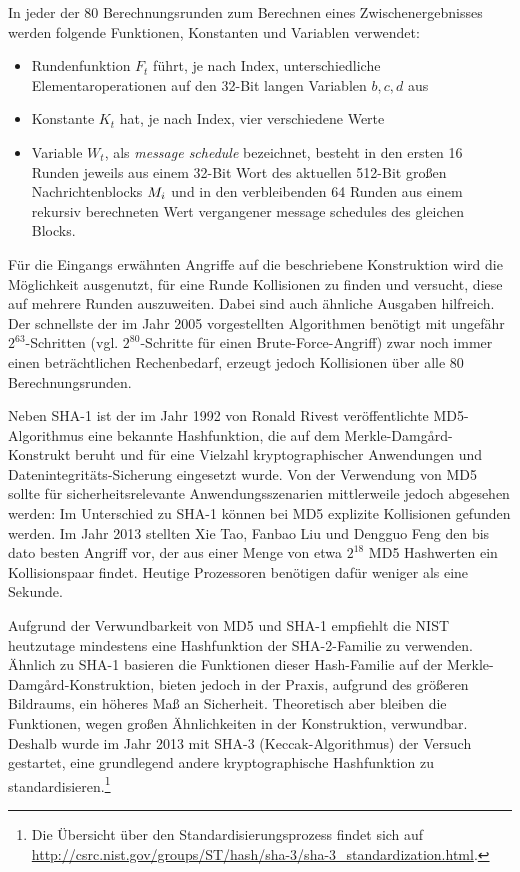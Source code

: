 In jeder der 80 Berechnungsrunden zum Berechnen eines Zwischenergebnisses werden folgende Funktionen, Konstanten und Variablen verwendet:
\begin{itemize}
	\item Rundenfunktion $F_{t}$ führt, je nach Index, unterschiedliche Elementaroperationen auf den 32-Bit langen Variablen $b, c, d$ aus
	\item Konstante $K_{t}$ hat, je nach Index, vier verschiedene Werte
	\item Variable $W_{t}$, als \textit{message schedule} bezeichnet, besteht in den ersten 16 Runden jeweils aus einem 32-Bit Wort des aktuellen 512-Bit großen Nachrichtenblocks $M_{i}$ und in den verbleibenden 64 Runden aus einem rekursiv berechneten Wert vergangener message schedules des gleichen Blocks.
\end{itemize}

Für die Eingangs erwähnten Angriffe auf die beschriebene Konstruktion wird die Möglichkeit ausgenutzt, für eine Runde Kollisionen zu finden und versucht, diese auf mehrere Runden auszuweiten. Dabei sind auch ähnliche Ausgaben hilfreich. Der schnellste der im Jahr 2005 vorgestellten Algorithmen benötigt mit ungefähr $2^{63}$-Schritten (vgl. $2^{80}$-Schritte für einen Brute-Force-Angriff) zwar noch immer einen beträchtlichen Rechenbedarf, erzeugt jedoch Kollisionen über alle 80 Berechnungsrunden.

Neben SHA-1 ist der im Jahr 1992 von Ronald Rivest veröffentlichte MD5-Algorithmus eine bekannte Hashfunktion, die auf dem Merkle-Damgård-Konstrukt beruht und für eine Vielzahl kryptographischer Anwendungen und Datenintegritäts-Sicherung eingesetzt wurde. Von der Verwendung von MD5 sollte für sicherheitsrelevante Anwendungsszenarien mittlerweile jedoch abgesehen werden: Im Unterschied zu SHA-1 können bei MD5 explizite Kollisionen gefunden werden. Im Jahr 2013 stellten Xie Tao, Fanbao Liu und Dengguo Feng den bis dato besten Angriff vor, der aus einer Menge von etwa $2^{18}$ MD5 Hashwerten ein Kollisionspaar findet. Heutige Prozessoren benötigen dafür weniger als eine Sekunde.

Aufgrund der Verwundbarkeit von MD5 und SHA-1 empfiehlt die NIST heutzutage mindestens eine Hashfunktion der SHA-2-Familie zu verwenden. Ähnlich zu SHA-1 basieren die Funktionen dieser Hash-Familie auf der Merkle-Damgård-Konstruktion, bieten jedoch in der Praxis, aufgrund des größeren Bildraums, ein höheres Maß an Sicherheit. Theoretisch aber bleiben die Funktionen, wegen großen Ähnlichkeiten in der Konstruktion, verwundbar. Deshalb wurde im Jahr 2013 mit SHA-3 (\glqq Keccak\grqq{}-Algorithmus) der Versuch gestartet, eine grundlegend andere kryptographische Hashfunktion zu standardisieren.\footnote{Die Übersicht über den Standardisierungsprozess findet sich auf \url{http://csrc.nist.gov/groups/ST/hash/sha-3/sha-3_standardization.html}.}

